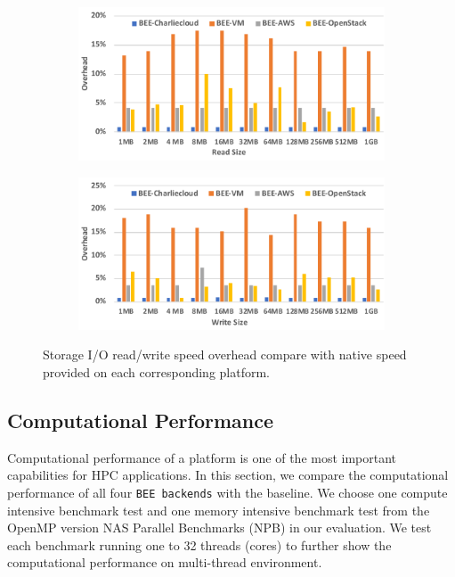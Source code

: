 \begin{figure}[t]
    \centering
    \begin{subfigure}[t]{0.49\textwidth}
        \includegraphics[width=\textwidth]{figures/read.pdf}
    \end{subfigure}
    \begin{subfigure}[t]{0.49\textwidth}
        \includegraphics[width=\textwidth]{figures/write.pdf}
    \end{subfigure}
    \vspace*{-0.5em}
    \caption{Storage I/O read/write speed overhead compare with native speed provided on each corresponding platform.}
    \label{io}
    \vspace*{-2em}
\end{figure}



\subsection{Computational Performance}
Computational performance of a platform is one of the most important capabilities for HPC applications. In this section, we compare the computational performance of all four \texttt{BEE backends} with the baseline. We choose one compute intensive benchmark test and one memory intensive benchmark test from the OpenMP version NAS Parallel Benchmarks (NPB)\cite{npb} in our evaluation. We test each benchmark running one to 32 threads (cores) to further show the computational performance on multi-thread environment. 
